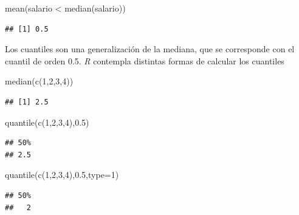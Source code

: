 \documentclass[
]{book}
\newenvironment{Shaded}{\begin{snugshade}}{\end{snugshade}}
\newcommand{\AttributeTok}[1]{\textcolor[rgb]{0.77,0.63,0.00}{#1}}
\newcommand{\DecValTok}[1]{\textcolor[rgb]{0.00,0.00,0.81}{#1}}
\newcommand{\FloatTok}[1]{\textcolor[rgb]{0.00,0.00,0.81}{#1}}
\newcommand{\FunctionTok}[1]{\textcolor[rgb]{0.00,0.00,0.00}{#1}}
\newcommand{\NormalTok}[1]{#1}
\newcommand{\SpecialCharTok}[1]{\textcolor[rgb]{0.00,0.00,0.00}{#1}}
\theoremstyle{break}
\begin{document}
\begin{Shaded}
\begin{Highlighting}[]
\FunctionTok{mean}\NormalTok{(salario }\SpecialCharTok{\textless{}} \FunctionTok{median}\NormalTok{(salario))}
\end{Highlighting}
\end{Shaded}

\begin{verbatim}
## [1] 0.5
\end{verbatim}

Los cuantiles son una generalización de la mediana, que se corresponde con el
cuantil de orden 0.5. \emph{R} contempla distintas formas
de calcular los cuantiles

\begin{Shaded}
\begin{Highlighting}[]
\FunctionTok{median}\NormalTok{(}\FunctionTok{c}\NormalTok{(}\DecValTok{1}\NormalTok{,}\DecValTok{2}\NormalTok{,}\DecValTok{3}\NormalTok{,}\DecValTok{4}\NormalTok{))}
\end{Highlighting}
\end{Shaded}

\begin{verbatim}
## [1] 2.5
\end{verbatim}

\begin{Shaded}
\begin{Highlighting}[]
\FunctionTok{quantile}\NormalTok{(}\FunctionTok{c}\NormalTok{(}\DecValTok{1}\NormalTok{,}\DecValTok{2}\NormalTok{,}\DecValTok{3}\NormalTok{,}\DecValTok{4}\NormalTok{),}\FloatTok{0.5}\NormalTok{)}
\end{Highlighting}
\end{Shaded}

\begin{verbatim}
## 50% 
## 2.5
\end{verbatim}

\begin{Shaded}
\begin{Highlighting}[]
\FunctionTok{quantile}\NormalTok{(}\FunctionTok{c}\NormalTok{(}\DecValTok{1}\NormalTok{,}\DecValTok{2}\NormalTok{,}\DecValTok{3}\NormalTok{,}\DecValTok{4}\NormalTok{),}\FloatTok{0.5}\NormalTok{,}\AttributeTok{type=}\DecValTok{1}\NormalTok{)}
\end{Highlighting}
\end{Shaded}

\begin{verbatim}
## 50% 
##   2
\end{verbatim}
\end{document}
